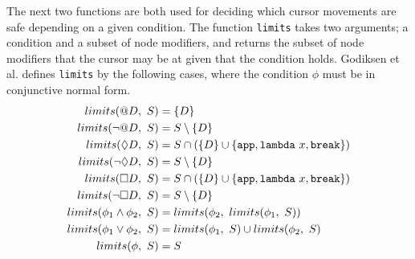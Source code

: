 The next two functions are both used for deciding which cursor movements are
safe depending on a given condition. The function \texttt{limits} takes two
arguments; a condition and a subset of node modifiers, and returns the subset
of node modifiers that the cursor may be at given that the condition holds.
Godiksen et al. defines \texttt{limits} by the following cases, where the
condition $\phi$ must be in conjunctive normal form.
\begin{align*}
    limits(@D,~S) &= \{ D \} \\
    limits(\neg@D,~S) &= S \setminus \{ D \} \\
    limits(\possibly D,~S) &= S \cap (\{ D \} \cup \{ \aamApp, \aamLambda{x}, \aamBreak\}) \\
    limits(\neg\possibly D,~S) &= S \setminus \{ D \}  \\
    limits(\necessarily D,~S) &= S \cap (\{ D \} \cup \{ \aamApp, \aamLambda{x}, \aamBreak\})  \\
    limits(\neg\necessarily D,~S) &= S \setminus \{ D \}  \\
    limits(\phi_1 \land \phi_2,~S) &= limits(\phi_2,~limits(\phi_1,~S)) \\
    limits(\phi_1 \lor \phi_2,~S) &= limits(\phi_1,~S) \cup limits(\phi_2,~S) \\
    limits(\phi,~S) &= S
\end{align*}


